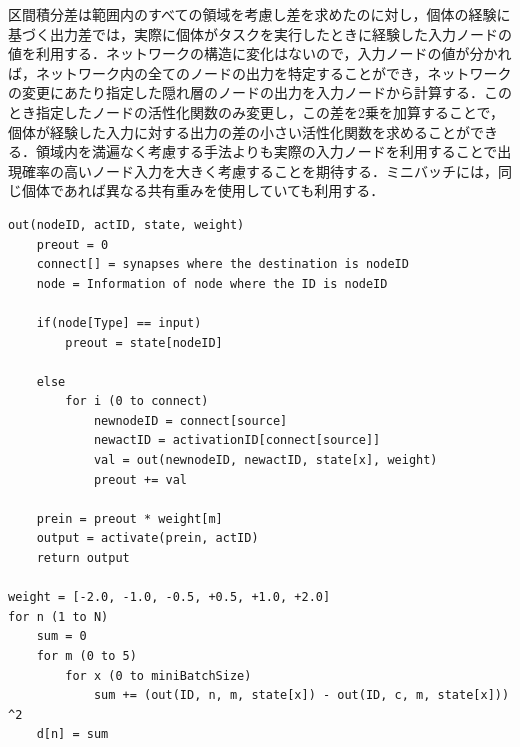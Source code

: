 区間積分差は範囲内のすべての領域を考慮し差を求めたのに対し，個体の経験に基づく出力差では，実際に個体がタスクを実行したときに経験した入力ノードの値を利用する．ネットワークの構造に変化はないので，入力ノードの値が分かれば，ネットワーク内の全てのノードの出力を特定することができ，ネットワークの変更にあたり指定した隠れ層のノードの出力を入力ノードから計算する．このとき指定したノードの活性化関数のみ変更し，この差を2乗を加算することで，個体が経験した入力に対する出力の差の小さい活性化関数を求めることができる．領域内を満遍なく考慮する手法よりも実際の入力ノードを利用することで出現確率の高いノード入力を大きく考慮することを期待する．ミニバッチには，同じ個体であれば異なる共有重みを使用していても利用する．

\begin{lstlisting}[caption=経験入力に基づく出力差のプログラム]
out(nodeID, actID, state, weight)
    preout = 0
    connect[] = synapses where the destination is nodeID
    node = Information of node where the ID is nodeID

    if(node[Type] == input)
        preout = state[nodeID]
    
    else
        for i (0 to connect)
            newnodeID = connect[source]
            newactID = activationID[connect[source]]
            val = out(newnodeID, newactID, state[x], weight)
            preout += val
    
    prein = preout * weight[m]
    output = activate(prein, actID)
    return output

weight = [-2.0, -1.0, -0.5, +0.5, +1.0, +2.0]
for n (1 to N)
    sum = 0
    for m (0 to 5)
        for x (0 to miniBatchSize)
            sum += (out(ID, n, m, state[x]) - out(ID, c, m, state[x])) ^2
    d[n] = sum
\end{lstlisting}

